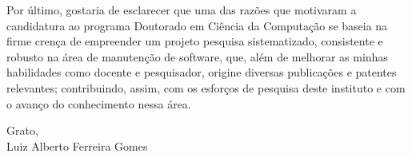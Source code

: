 \documentclass[11pt]{letter}
\begin{document}
Por último, gostaria de esclarecer que uma das razões que motivaram a candidatura ao programa Doutorado em Ciência da Computação 
se baseia na firme crença de empreender um projeto pesquisa sistematizado, consistente e robusto na área de manutenção de software, 
que, além de  melhorar as minhas habilidades como docente e pesquisador, origine diversas publicações e patentes relevantes; contribuindo, 
assim, com os esforços de pesquisa deste instituto e com o avanço do conhecimento nessa área.

\begin{flushright}
 
Grato,\\
Luiz Alberto Ferreira Gomes 
\end{flushright}
\end{document}
